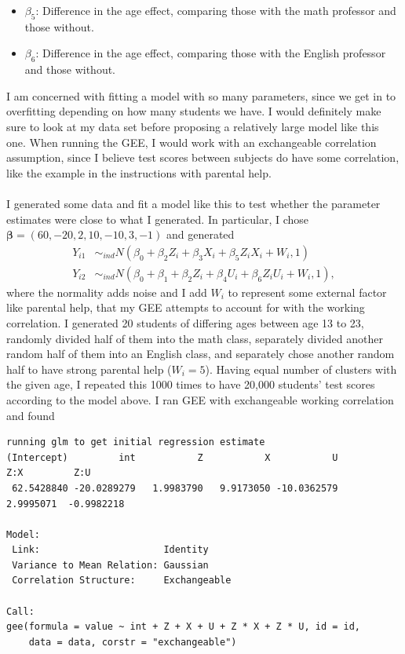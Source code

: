 \documentclass[11pt]{article}
\begin{document}
\begin{enumerate}
\begin{itemize}
		\item $\beta_5$: Difference in the age effect, comparing those with the math professor and those without.
		\item $\beta_6$: Difference in the age effect, comparing those with the English professor and those without.
	\end{itemize}
	I am concerned with fitting a model with so many parameters, since we get in to overfitting depending on how many students we have. I would definitely make sure to look at my data set before proposing a relatively large model like this one. When running the GEE, I would work with an exchangeable correlation assumption, since I believe test scores between subjects do have some correlation, like the example in the instructions with parental help. 
	\\ \\I generated some data and fit a model like this to test whether the parameter estimates were close to what I generated. In particular, I chose $\bm{\beta} = (60,-20,2,10,-10,3,-1)$ and generated 
	\begin{align*}
		Y_{i1}&\sim_{ind} N(\beta_0 + \beta_2 Z_i + \beta_3 X_i + \beta_5 Z_iX_i + W_i,1) \\
		Y_{i2}&\sim_{ind} N(\beta_0 + \beta_1 + \beta_2 Z_i + \beta_4 U_i + \beta_6 Z_iU_i + W_i,1),
	\end{align*}
	where the normality adds noise and I add $W_i$ to represent some external factor like parental help, that my GEE attempts to account for with the working correlation. I generated 20 students of differing ages between age 13 to 23, randomly divided half of them into the math class, separately divided another random half of them into an English class, and separately chose another random half to have strong parental help ($W_i=5$). Having equal number of clusters with the given age, I repeated this 1000 times to have 20,000 students' test scores according to the model above. I ran GEE with exchangeable working correlation and found
	\begin{verbatim}
running glm to get initial regression estimate
(Intercept)         int           Z           X           U         Z:X         Z:U 
 62.5428840 -20.0289279   1.9983790   9.9173050 -10.0362579   2.9995071  -0.9982218 

Model:
 Link:                      Identity 
 Variance to Mean Relation: Gaussian 
 Correlation Structure:     Exchangeable 

Call:
gee(formula = value ~ int + Z + X + U + Z * X + Z * U, id = id, 
    data = data, corstr = "exchangeable")


\end{verbatim}
\end{enumerate}
\end{document}
